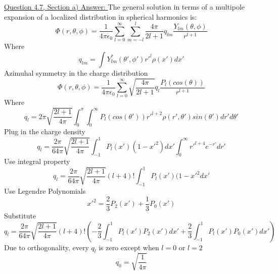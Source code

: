 \documentclass[12pt]{article}
\begin{document}
    \underline{Question 4.7, Section a) Answer: }
    \newline The general solution in terms of a multipole expansion of a localized distribution in spherical harmonics is:
    \begin{equation} \label{eq: 4.1.1}
        \Phi(r,\theta,\phi) = \frac{1}{4 \pi \epsilon_0} \sum_{l=0}^\infty \sum_{m=-l}^l \frac{4 \pi}{2l+1} q_{lm} \frac{Y_{lm}(\theta, \phi)}{r^{l+1}}
    \end{equation}
    Where
    \begin{equation} \label{eq: 4.1.2}
        q_{lm} = \int Y_{lm}^*(\theta', \phi') {r'}^l \rho(x') dx'
    \end{equation}
    \newline Azimuhal symmetry in the charge distribution
    \begin{equation} \label{eq: 4.1.3}
        \Phi(r,\theta, \phi) = \frac{1}{4 \pi \epsilon_0} \sum_{l=0}^\infty \sqrt{\frac{4 \pi}{2l+1}} q_l \frac{P_l(cos(\theta))}{r^{l+1}}
    \end{equation}
    Where 
    \begin{equation} \label{eq: 4.1.4}
        q_l = 2 \pi \sqrt{\frac{2l+1}{4 \pi}} \int_0^\pi \int_0^\infty P_l(cos(\theta')) {r'}^{l+2} \rho(r', \theta') sin(\theta') dr' d\theta'
    \end{equation}
    Plug in the charge density
    \begin{equation} \label{eq: 4.1.5}
        q_l = \frac{2 \pi}{64 \pi} \sqrt{\frac{2l + 1}{4 \pi}} \int_{-1}^1 P_l(x')(1-{x'}^2) dx' \int_0^\infty {r'}^{l+4} e^{-r'} dr'
    \end{equation}
    Use integral property
    \begin{equation} \label{eq: 4.1.6}
        q_l = \frac{2 \pi}{64 \pi} \sqrt{\frac{2l + 1}{4 \pi}} (l+4)! \int_{-1}^1 P_l(x')(1-{x'}^2 dx'
    \end{equation}
    Use Legendre Polynomials
    \begin{equation} \label{eq: 4.1.7}
        {x'}^2 = \frac{2}{3} P_2(x') + \frac{1}{3} P_0(x')
    \end{equation}
    Substitute
    \begin{equation} \label{eq: 4.1.8}
        q_l = \frac{2 \pi}{64 \pi} \sqrt{\frac{2l + 1}{4 \pi}} (l+4)! \left(-\frac{2}{3} \int_{-1}^1 P_l(x') P_2(x') dx' + \frac{2}{3} \int_{-1}^1 P_l(x') P_0(x') dx' \right)
    \end{equation}
    Due to orthogonality, every $q_l$ is zero except when $l=0$ or $l=2$
    \begin{equation} \label{eq: 4.1.9}
        q_0 = \sqrt{\frac{1}{4\pi}}
    \end{equation}
\end{document}
